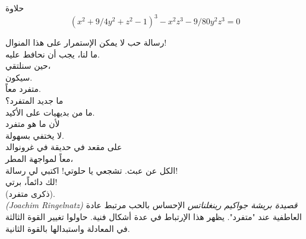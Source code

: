 \begin{surferPage}{حلاوة}
\[(x^2+ 9/4y^2	+ z^2- 1)^3- x^2z^3	- 9/80y^2z^3	= 0\]

\singlespacing
رسالة حب
\singlespacing
لا يمكن الإستمرار على هذا المنوال!\\
ما لنا، يجب أن نحافط عليه.\\
حين سنلتقي،\\
 سيكون.\\
متفرد معاً. \\
ما جديد المتفرد؟\\
ما من بديهيات على الأكيد.\\
لأن ما هو متفرد\\
لا يختفي بسهولة.\\
على مقعد في حديقة في غرونوالد\\
معاً لمواجهة المطر،\\
الكل عن عبث. تشجعي يا حلوتي! اكتبي لي رسالة!\\
لك دائماً، برتي!\\
 (ذكرى متفرد).\\
\textit{\textenglish{(Joachim Ringelnatz)} قصيدة بريشة جواكيم رينغلناتس}
\singlespacing
الإحساس بالحب مرتبط عادة العاطفية عند "متفرد". يظهر هذا الإرتباط في عدة أشكال فنية.
\singlespacing
حاولوا تغيير القوة الثالثة في المعادلة واستبدالها بالقوة الثانية.
\end{surferPage}

